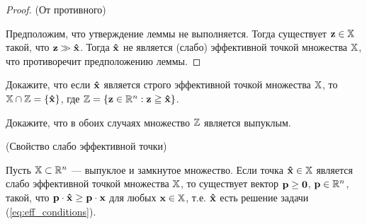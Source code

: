 \begin{proof}(От противного)

Предположим, что утверждение леммы не выполняется. Тогда существует
$\mathbf{z} \in \mathbb{X}$ такой, что $\mathbf{z} \gg \mathbf{\hat x}$. Тогда
$\mathbf{\hat x}$ не является (слабо) эффективной точкой множества
$\mathbb{X}$, что противоречит предположению леммы.

\end{proof}

\begin{exer}
Докажите, что если  $\mathbf{\hat x}$ является строго эффективной точкой
множества $\mathbb{X}$, то $\mathbb{X} \cap \mathbb{Z}=\{\mathbf{\hat x}\}$, где
$\mathbb{Z}=\{\mathbf{z}\in \mathbb{R}^n: \mathbf{z} \geqq \mathbf{\hat x}\}$.
\end{exer}

\begin{exer}
Докажите, что в обоих случаях множество $\mathbb{Z}$ является выпуклым.
\end{exer}

\begin{teop}(Свойство слабо эффективной точки)\label{teo:2_fund_production}

Пусть $\mathbb{X} \subset \mathbb{R}^n$ --- выпуклое и замкнутое множество. Если
точка ${\mathbf{\hat x} \in \mathbb{X}}$ является слабо эффективной точкой
множества $\mathbb{X}$, то существует вектор ${\mathbf{p} \geq \mathbf{0}}$,
$\mathbf{p} \in \mathbb{R}^n$, такой, что $\mathbf{p} \cdot \mathbf{\hat x} \geq \mathbf{p}
\cdot \mathbf{x}$ для любых $\mathbf{x} \in \mathbb{X}$, т.е. $\mathbf{\hat x}$ есть
решение задачи (\ref{eq:eff_conditions}).
\end{teop}

